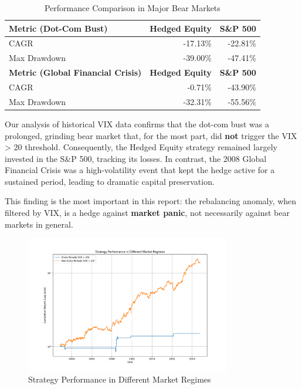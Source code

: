 \documentclass{article}
\begin{document}
\begin{table}[htbp]
\centering
\caption{Performance Comparison in Major Bear Markets}
\begin{tabular}{lrr}
\toprule
\textbf{Metric (Dot-Com Bust)} & \textbf{Hedged Equity} & \textbf{S\&P 500} \\
\midrule
CAGR           & -17.13\% & -22.81\% \\
Max Drawdown   & -39.00\% & -47.41\% \\
\midrule
\textbf{Metric (Global Financial Crisis)} & \textbf{Hedged Equity} & \textbf{S\&P 500} \\
\midrule
CAGR           & -0.71\% & -43.90\% \\
Max Drawdown   & -32.31\% & -55.56\% \\
\bottomrule
\end{tabular}
\end{table}

Our analysis of historical VIX data confirms that the dot-com bust was a prolonged, grinding bear market that, for the most part, did \textbf{not} trigger the VIX > 20 threshold. Consequently, the Hedged Equity strategy remained largely invested in the S\&P 500, tracking its losses. In contrast, the 2008 Global Financial Crisis was a high-volatility event that kept the hedge active for a sustained period, leading to dramatic capital preservation.

This finding is the most important in this report: the rebalancing anomaly, when filtered by VIX, is a hedge against \textbf{market panic}, not necessarily against bear markets in general.

\begin{figure}[htbp]
\centering
\includegraphics[width=0.8\textwidth]{plots/plot_crisis_analysis.png}
\caption{Strategy Performance in Different Market Regimes}
\end{figure}
\end{document}
